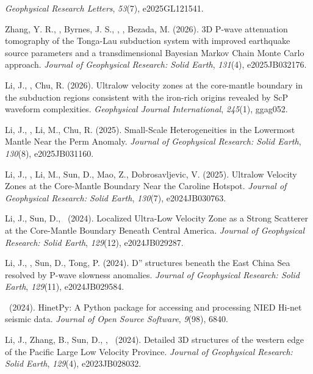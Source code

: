 \begin{etaremune}
    \emph{Geophysical Research Letters}, \emph{53}(7), e2025GL121541.
\item Zhang, Y. R.\CS, \SWei\CS, Byrnes, J. S., \Me, \FWang, Bezada, M. (2026).
    3D P-wave attenuation tomography of the Tonga-Lau subduction system with improved
    earthquake source parameters and a transdimensional Bayesian Markov Chain Monte Carlo approach.
    \emph{Journal of Geophysical Research: Solid Earth}, \emph{131}(4), e2025JB032176.
\item Li, J.\CS, \Me, Chu, R. (2026).
    Ultralow velocity zones at the core-mantle boundary in the subduction regions
    consistent with the iron-rich origins revealed by ScP waveform complexities.
    \emph{Geophysical Journal International}, \emph{245}(1), ggag052.
\item Li, J.\CS, \Me, Li, M., Chu, R. (2025).
	Small-Scale Heterogeneities in the Lowermost Mantle Near the Perm Anomaly.
	\emph{Journal of Geophysical Research: Solid Earth}, \emph{130}(8), e2025JB031160.
\item Li, J.\CS, \Me\CS, Li, M., Sun, D., Mao, Z., Dobrosavljevic, V. (2025).
    Ultralow Velocity Zones at the Core-Mantle Boundary Near the Caroline Hotspot.
    \emph{Journal of Geophysical Research: Solid Earth}, \emph{130}(7), e2024JB030763.
\item Li, J.\CS, Sun, D., \Me\ (2024).
    Localized Ultra-Low Velocity Zone as a Strong Scatterer at the Core-Mantle Boundary Beneath Central America.
    \emph{Journal of Geophysical Research: Solid Earth}, \emph{129}(12), e2024JB029287.
\item Li, J.\CS, \Me, Sun, D., Tong, P. (2024).
    D'' structures beneath the East China Sea resolved by P-wave slowness anomalies.
    \emph{Journal of Geophysical Research: Solid Earth}, \emph{129}(11), e2024JB029584.
\item \Me\ (2024).
    HinetPy: A Python package for accessing and processing NIED Hi-net seismic data.
    \emph{Journal of Open Source Software}, \emph{9}(98), 6840.
\item Li, J.\CS, Zhang, B., Sun, D., \Me, \JYao\ (2024).
    Detailed 3D structures of the western edge of the Pacific Large Low Velocity Province.
    \emph{Journal of Geophysical Research: Solid Earth}, \emph{129}(4), e2023JB028032.

\end{etaremune}
